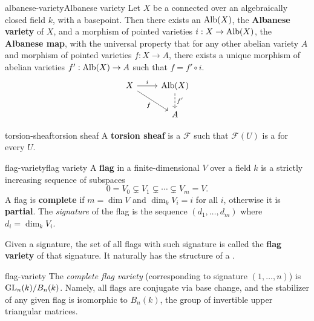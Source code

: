 \begin{topic}{albanese-variety}{Albanese variety}
    Let $X$ be a connected   over an algebraically closed field $k$, with a basepoint. Then there exists an  $\textup{Alb}(X)$, the \textbf{Albanese variety} of $X$, and a morphism of pointed varieties $i : X \to \textup{Alb}(X)$, the \textbf{Albanese map}, with the universal property that for any other abelian variety $A$ and morphism of pointed varieties $f : X \to A$, there exists a unique morphism of abelian varieties $f' : \textup{Alb}(X) \to A$ such that $f = f' \circ i$.
    \[ \begin{tikzcd} X \arrow{r}{i} \arrow[swap]{dr}{f} &  \textup{Alb}(X) \arrow[dashed]{d}{f'} \\ &  A \end{tikzcd} \]
\end{topic}

\begin{topic}{torsion-sheaf}{torsion sheaf}
    A \textbf{torsion sheaf} is a  $\mathcal{F}$ such that $\mathcal{F}(U)$ is a   for every $U$.
\end{topic}

\begin{topic}{flag-variety}{flag variety}
    A \textbf{flag} in a finite-dimensional  $V$ over a field $k$ is a strictly increasing sequence of subspaces
    \[ 0 = V_0 \subsetneq V_1 \subsetneq \cdots \subsetneq V_m = V . \]
    A flag is \textbf{complete} if $m = \dim V$ and $\dim_k V_i = i$ for all $i$, otherwise it is \textbf{partial}. The \textit{signature} of the flag is the sequence $(d_1, \ldots, d_m)$ where $d_i = \dim_k V_i$.
    
    Given a signature, the set of all flags with such signature is called the \textbf{flag variety} of that signature. It naturally has the structure of a  .
\end{topic}

\begin{example}{flag-variety}
    The \textit{complete flag variety} (corresponding to signature $(1, \ldots, n)$) is $\textup{GL}_n(k) / B_n(k)$. Namely, all flags are conjugate via base change, and the stabilizer of any given flag is isomorphic to $B_n(k)$, the group of invertible upper triangular matrices.
\end{example}

